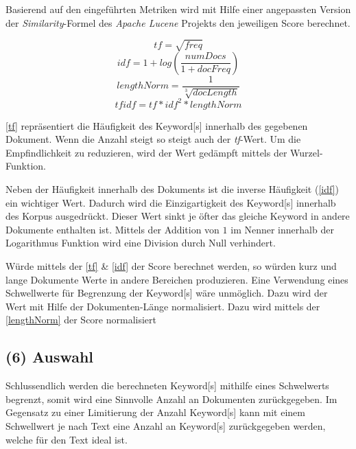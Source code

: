Basierend auf den eingeführten Metriken wird mit Hilfe einer angepassten Version der \textit{Similarity}-Formel\footnotemark {} des \textit{Apache Lucene} Projekts den jeweiligen Score berechnet.

\begin{equation}\label{tf}
tf = \sqrt{freq} 
\end{equation}
\begin{equation}\label{idf}
idf  =  1 +log( \frac{numDocs}{1 + docFreq})
\end{equation}
\begin{equation}\label{lengthNorm}
lengthNorm =\frac{1}{\sqrt[3]{docLength}} 
\end{equation}
\begin{equation}\label{tfidf}
tfidf = tf * idf^2 * lengthNorm
\end{equation}

\autoref{tf} repräsentiert die Häufigkeit des \gls{Keyword}[s] innerhalb des gegebenen Dokument. Wenn die Anzahl steigt so steigt auch der \textit{tf}-Wert. Um die Empfindlichkeit zu reduzieren, wird der Wert gedämpft mittels der Wurzel-Funktion. 

Neben der Häufigkeit innerhalb des Dokuments ist die inverse Häu\-fig\-keit (\autoref{idf}) ein wichtiger Wert. Dadurch wird die Einzigartigkeit des \gls{Keyword}[s] innerhalb des Korpus ausgedrückt. Dieser Wert sinkt je öfter das gleiche \gls{Keyword} in andere Dokumente enthalten ist. Mittels der Addition von $1$ im Nenner innerhalb der Logarithmus Funktion wird eine Division durch Null verhindert. 

Würde mittels der \autoref{tf} \& \autoref{idf} der Score berechnet werden, so würden kurz und lange Dokumente Werte in andere Bereichen produzieren. Eine Verwendung eines Schwellwerte für Begrenzung der \gls{Keyword}[s] wäre unmöglich. Dazu wird der Wert mit Hilfe der Dokumenten-Länge normalisiert. Dazu wird mittels der \autoref{lengthNorm} der Score normalisiert



\subsection{(6) Auswahl}


Schlussendlich werden die berechneten \gls{Keyword}[s] mithilfe eines Schw\-el\-werts begrenzt, somit wird eine Sinnvolle Anzahl an Dokumenten zurückgegeben. Im Gegensatz zu einer Limitierung der Anzahl \gls{Keyword}[s] kann mit einem Schwellwert je nach Text eine Anzahl an \gls{Keyword}[s] zurückgegeben werden, welche für den Text ideal ist.


